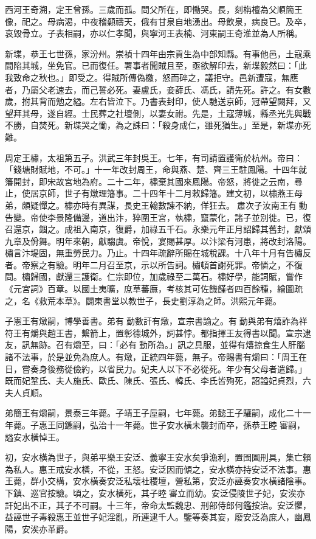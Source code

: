 西河王奇溯，定王曾孫。三歲而孤。問父所在，即慟哭。長，刻栴檀為父順簡王像，祀之。母病渴，中夜稽顙禱天，俄有甘泉自地湧出。母飲泉，病良已。及卒，哀毀骨立。子表相嗣，亦以仁孝聞，與寧河王表楠、河東嗣王奇淮並為人所稱。

新堞，恭王七世孫，家汾州。崇禎十四年由宗貢生為中部知縣。有事他邑，土寇乘間陷其城，坐免官。已而復任。署事者聞賊且至，亟欲解印去，新堞毅然曰：「此我致命之秋也。」即受之。得賊所傳偽檄，怒而碎之，議拒守。邑新遭寇，無應者，乃屬父老速去，而己誓必死。妻盧氏，妾薛氏、馮氏，請先死。許之。有女數歲，拊其背而勉之縊。左右皆泣下。乃書表封印，使人馳送京師，冠帶望闕拜，又望拜其母，遂自經。士民葬之社壇側，以妻女祔。先是，土寇薄城，縣丞光先與戰不勝，自焚死。新堞哭之慟，為之誄曰：「殺身成仁，雖死猶生。」至是，新堞亦死難。

周定王橚，太祖第五子。洪武三年封吳王。七年，有司請置護衛於杭州。帝曰：「錢塘財賦地，不可。」十一年改封周王，命與燕、楚、齊三王駐鳳陽。十四年就籓開封，即宋故宮地為府。二十二年，橚棄其國來鳳陽。帝怒，將徙之云南，尋止，使居京師，世子有燉理籓事。二十四年十二月敕歸籓。建文初，以橚燕王母弟，頗疑憚之。橚亦時有異謀，長史王翰數諫不納，佯狂去。肅次子汝南王有動告變。帝使李景隆備邊，道出汴，猝圍王宮，執橚，竄蒙化，諸子並別徙。已，復召還京，錮之。成祖入南京，復爵，加祿五千石。永樂元年正月詔歸其舊封，獻頌九章及佾舞。明年來朝，獻騶虞。帝悅，宴賜甚厚。以汴梁有河患，將改封洛陽。橚言汴堤固，無重勞民力。乃止。十四年疏辭所賜在城稅課。十八年十月有告橚反者。帝察之有驗。明年二月召至京，示以所告詞。橚頓首謝死罪。帝憐之，不復問。橚歸國，獻還三護衛。仁宗即位，加歲祿至二萬石。橚好學，能詞賦，嘗作《元宮詞》百章。以國土夷曠，庶草蕃廡，考核其可佐饑饉者四百餘種，繪圖疏之，名《救荒本草》。闢東書堂以教世子，長史劉淳為之師。洪熙元年薨。

子憲王有燉嗣，博學善書。弟有動數訐有燉，宣宗書諭之。有動與弟有熺詐為祥符王有爝與趙王書，繫箭上，置彰德城外，詞甚悖。都指揮王友得書以聞。宣宗逮友，訊無跡。召有爝至，曰：「必有動所為。」訊之具服，並得有熺掠食生人肝腦諸不法事，於是並免為庶人。有燉，正統四年薨，無子。帝賜書有爝曰：「周王在日，嘗奏身後務從儉約，以省民力。妃夫人以下不必從死。年少有父母者遣歸。」既而妃鞏氏、夫人施氏、歐氏、陳氏、張氏、韓氏、李氏皆殉死，詔謚妃貞烈，六夫人貞順。

弟簡王有爝嗣，景泰三年薨。子靖王子垕嗣，七年薨。弟懿王子驩嗣，成化二十一年薨。子惠王同鑣嗣，弘治十一年薨。世子安水橫未襲封而卒，孫恭王睦審嗣，謚安水橫悼王。

初，安水橫為世子，與弟平樂王安泛、義寧王安水矣爭漁利，置囹圄刑具，集亡賴為私人。惠王戒安水橫，不從，王怒。安泛因而傾之，安水橫亦持安泛不法事。惠王薨，群小交構，安水橫奏安泛私壞社稷壇，營私第，安泛亦誣奏安水橫諸陰事。下鎮、巡官按驗。頃之，安水橫死，其子睦審立而幼。安泛侵陵世子妃，安涘亦訐妃出不正，其子不可嗣。十三年，帝命太監魏忠、刑部侍郎何鑑按治。安泛懼，益誣世子毒殺惠王並世子妃淫亂，所連逮千人。鑒等奏其妄，廢安泛為庶人，幽鳳陽，安涘亦革爵。

